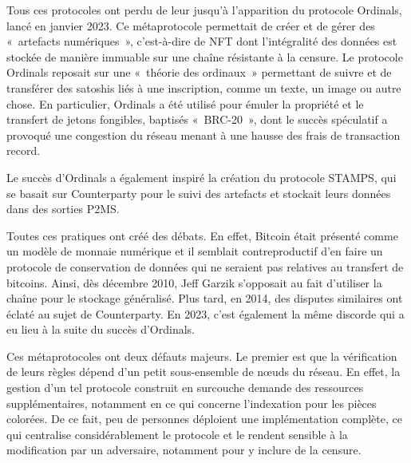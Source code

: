 Tous ces protocoles ont perdu de leur jusqu'à l'apparition du protocole Ordinals, lancé en janvier 2023. Ce métaprotocole permettait de créer et de gérer des «~artefacts numériques~», c'est-à-dire de NFT dont l'intégralité des données est stockée de manière immuable sur une chaîne résistante à la censure. Le protocole Ordinals reposait sur une «~théorie des ordinaux~» permettant de suivre et de transférer des satoshis liés à une inscription, comme un texte, un image ou autre chose. En particulier, Ordinals a été utilisé pour émuler la propriété et le transfert de jetons fongibles, baptisés «~BRC-20~», dont le succès spéculatif a provoqué une congestion du réseau menant à une hausse des frais de transaction record.

Le succès d'Ordinals a également inspiré la création du protocole STAMPS, qui se basait sur Counterparty pour le suivi des artefacts et stockait leurs données dans des sorties P2MS.

Toutes ces pratiques ont créé des débats. En effet, Bitcoin était présenté comme un modèle de monnaie numérique et il semblait contreproductif d'en faire un protocole de conservation de données qui ne seraient pas relatives au transfert de bitcoins. Ainsi, dès décembre 2010, Jeff Garzik s'opposait au fait d'utiliser la chaîne pour le stockage généralisé. Plus tard, en 2014, des disputes similaires ont éclaté au sujet de Counterparty. En 2023, c'est également la même discorde qui a eu lieu à la suite du succès d'Ordinals.

Ces métaprotocoles ont deux défauts majeurs. Le premier est que la vérification de leurs règles dépend d'un petit sous-ensemble de nœuds du réseau. En effet, la gestion d'un tel protocole construit en surcouche demande des ressources supplémentaires, notamment en ce qui concerne l'indexation pour les pièces colorées. De ce fait, peu de personnes déploient une implémentation complète, ce qui centralise considérablement le protocole et le rendent sensible à la modification par un adversaire, notamment pour y inclure de la censure.

